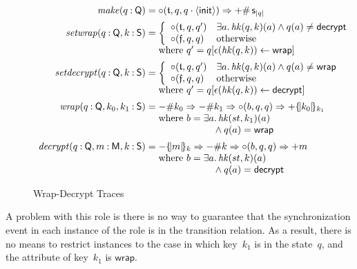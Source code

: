 \documentclass[12pt]{article}
\newcommand{\cn}[1]{\ensuremath{\operatorname{\mathsf{#1}}}}
\newcommand{\fn}[1]{\ensuremath{\operatorname{\mathit{#1}}}}
\newcommand{\srt}[1]{\ensuremath{\mathsf{#1}}}
\newcommand{\typ}{\mathbin:}
\newcommand{\seq}[1]{\ensuremath{\langle#1\rangle}}
\newcommand{\append}{\cdot}
\newcommand{\enc}[2]{\ensuremath{\{\!|#1|\!\}_{#2}}}
\newcommand{\inbnd}{\mathord -}
\newcommand{\outbnd}{\mathord +}
\newcommand{\neutral}{\mathord\circ}
\newcommand{\some}[1]{\exists#1\mathpunct.}
\newcommand{\truth}{\ensuremath{\mathfrak{t}}}
\newcommand{\falsehood}{\ensuremath{\mathfrak{f}}}
\newcommand{\ainit}{\ensuremath{\mathsf{init}}}
\newcommand{\awrap}{\ensuremath{\mathsf{wrap}}}
\newcommand{\adecrypt}{\ensuremath{\mathsf{decrypt}}}
\begin{document}
\begin{figure}
  \[
  \begin{array}{r@{}l}
    \fn{make}(q\typ\srt{Q})={}&\neutral(\truth,q,q\append\seq{\ainit})
    \Rightarrow\outbnd\#\cn{s}_{|q|}\\[1.2ex]
    \fn{setwrap}(q\typ\srt{Q},k\typ\srt{S})={}&
    \left\{
    \begin{array}{ll}
        \neutral(\truth,q, q')&\some{a}\fn{hk}(q,k)(a)\land
        q(a)\neq\adecrypt\\
        \neutral(\falsehood,q,q)&\mbox{otherwise}
    \end{array}
    \right.\\
    &\mbox{where }q'=q[\epsilon(\fn{hk}(q,k))\leftarrow\awrap]\\[1.2ex]
    \fn{setdecrypt}(q\typ\srt{Q},k\typ\srt{S})={}&
    \left\{
    \begin{array}{ll}
        \neutral(\truth,q, q')&\some{a}\fn{hk}(q,k)(a)\land
        q(a)\neq\awrap\\
        \neutral(\falsehood,q,q)&\mbox{otherwise}
    \end{array}
    \right.\\
    &\mbox{where }q'=q[\epsilon(\fn{hk}(q,k))\leftarrow\adecrypt]\\[1.2ex]
    \fn{wrap}(q\typ\srt{Q},k_0,k_1\typ\srt{S})={}&
    \inbnd\#k_0\Rightarrow\inbnd\#k_1\Rightarrow
    \neutral(b,q,q)\Rightarrow\outbnd\enc{k_0}{k_1}\\
    &\mbox{where }b={}\begin{array}[t]{@{}l}
      \some{a}\fn{hk}(st,k_1)(a)\\
      \quad{}\land q(a)=\awrap
      \end{array}\\[4ex]
    \fn{decrypt}(q\typ\srt{Q},m\typ\srt{M},k\typ\srt{S})={}&
    \inbnd\enc{m}{k}\Rightarrow\inbnd\#k\Rightarrow
    \neutral(b,q,q)\Rightarrow\outbnd m\\
    &\mbox{where }b={}\begin{array}[t]{@{}l}
      \some{a}\fn{hk}(st,k)(a)\\
      \quad{}\land q(a)=\adecrypt
      \end{array}
  \end{array}
  \]
  \caption{Wrap-Decrypt Traces}\label{fig:wrap-decrypt traces}

\end{figure}

A problem with this role is there is no way to guarantee that the
synchronization event in each instance of the role is in the
transition relation.  As a result, there is no means to restrict
instances to the case in which key~$k_1$ is in the state~$q$, and the
attribute of key~$k_1$ is \awrap.
\end{document}
